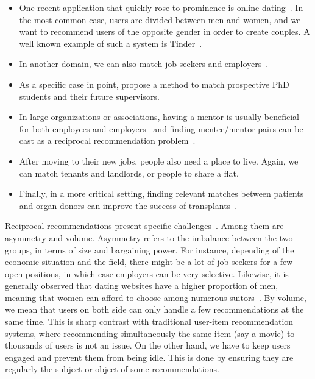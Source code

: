 \begin{itemize}[leftmargin=*]
  \item One recent application that quickly rose to prominence is online
    dating~\autocites{Krzywicki2015}{Xia2016a}{Alanazi}. In the most common case, users are divided
    between men and women, and we want to recommend users of the opposite gender in order to create
    couples. A well known example of such a system is Tinder~\autocite{TinderDesc16}.
  \item In another domain, we can also match job seekers and
    employers~\autocites{Siting2012}{Hong2013}{Kille2015}.
  \item As a specific case in point, \textcite{Zhang2016a} propose a method to match prospective PhD
    students and their future supervisors.
  \item In large organizations or associations, having a mentor is usually beneficial for
    both employees and employers~\autocite{mentorBenef04} and finding mentee/mentor pairs can be
    cast as a reciprocal recommendation problem~\autocite{OSSMentors12}.
  \item After moving to their new jobs, people also need a place to live. Again, we can match
    tenants and landlords, or people to share a flat.
  \item Finally, in a more critical setting, finding relevant matches between patients and organ
    donors can improve the success of transplants~\autocite{patientDonor17}.
\end{itemize}

Reciprocal recommendations present specific challenges~\autocite{Andrews2015}. Among them are
asymmetry and volume.  Asymmetry refers to the imbalance between the two groups, in terms of size
and bargaining power. For instance, depending of the economic situation and the field, there might
be a lot of job seekers for a few open positions, in which case employers can be very selective.
Likewise, it is generally observed that dating websites have a higher proportion of men, meaning
that women can afford to choose among numerous suitors~\autocite{TinderDesc16}. By volume, we mean
that users on both side can only handle a few recommendations at the same time. This is sharp
contrast with traditional user-item recommendation systems, where recommending simultaneously the
same item (say a movie) to thousands of users is not an issue. On the other hand, we have to keep
users engaged and prevent them from being idle. This is done by ensuring they are regularly the
subject or object of some recommendations.

